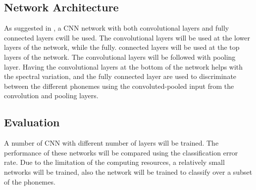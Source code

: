 \subsection{Network Architecture}
As suggested in \cite{sainath2013deep}, a CNN network with both convolutional layers and fully connected layers cwill be used. The convolutional layers will be used at the lower layers of the network, while the fully. connected layers will be used at the top layers of the network. The convolutional layers will be followed with pooling layer. Having the convolutional layers at the bottom of the network helps with the spectral variation, and the fully connected layer are used to discriminate between the different phonemes using the convoluted-pooled input from the convolution and pooling layers.
\subsection{Evaluation}
A number of CNN with different number of layers will be trained. The performance of these networks will be compared using the classification error rate. Due to the limitation of the computing resources, a relatively small networks will be trained, also the network will be trained to classify over a subset of the phonemes.